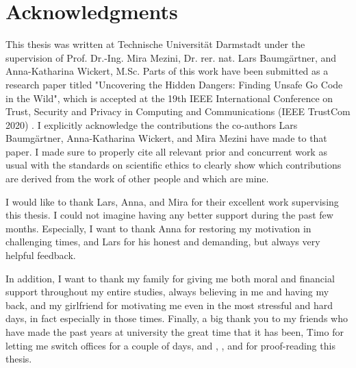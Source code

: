 \chapter*{Acknowledgments}

This thesis was written at Technische Universität Darmstadt under the supervision of Prof. Dr.-Ing. Mira Mezini,
Dr. rer. nat. Lars Baumgärtner, and Anna-Katharina Wickert, M.Sc.
Parts of this work have been submitted as a research paper titled "Uncovering the Hidden Dangers: Finding Unsafe Go Code
in the Wild", which is accepted at the 19th IEEE International Conference on Trust, Security and Privacy in
Computing and Communications (IEEE TrustCom 2020) .
I explicitly acknowledge the contributions the co-authors Lars Baumgärtner, Anna-Katharina Wickert, and Mira Mezini
have made to that paper.
I made sure to properly cite all relevant prior and concurrent work as usual with the standards on scientific ethics
to clearly show which contributions are derived from the work of other people and which are mine.

I would like to thank Lars, Anna, and Mira for their excellent work supervising this thesis.
I could not imagine having any better support during the past few months.
Especially, I want to thank Anna for restoring my motivation in challenging times, and Lars for his honest and
demanding, but always very helpful feedback.

In addition, I want to thank my family for giving me both moral and financial support throughout my entire studies,
always believing in me and having my back, and my girlfriend for motivating me even in the most stressful and hard
days, in fact especially in those times.
Finally, a big thank you to my friends who have made the past years at university the great time that it has been, Timo
for letting me switch offices for a couple of days, and , , and  for proof-reading this thesis.
